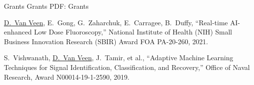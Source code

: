 \Section
{Grants}
{Grants}
{PDF: Grants}

\NumberedItem{[2]}
{\underline{D.~Van Veen}, E.~Gong, G.~Zaharchuk, E.~Carragee, B.~Duffy, ``Real-time AI-enhanced Low Dose Fluoroscopy,'' National Institute of Health (NIH) 
Small Business Innovation Research (SBIR) Award FOA PA-20-260, 2021.}

\Gap
\NumberedItem{[1]}
{S.~Vishwanath, \underline{D.~Van Veen}, J.~Tamir, et al., ``Adaptive Machine Learning Techniques for Signal
Identification, Classification,
and Recovery,'' Office of Naval Research, Award N00014-19-1-2590, 2019.}